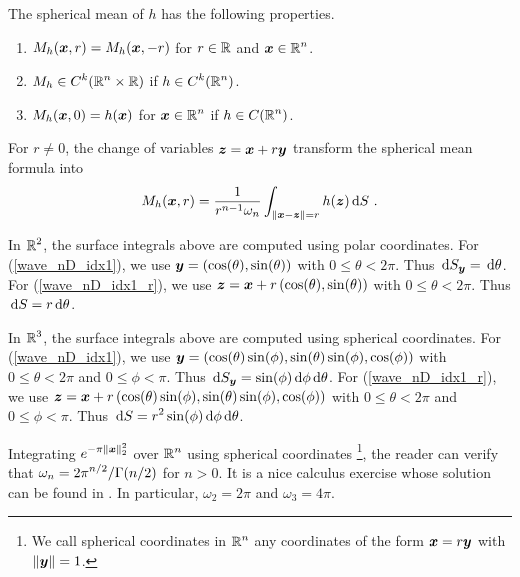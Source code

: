 The spherical mean of $h$ has the following properties.
\begin{enumerate}
\item $M_h({\bm{x}},r) = M_h({\bm{x}},-r)$ for $r\in \mathbb{R}$ and
$\displaystyle {\bm{x}} \in \mathbb{R}^n$.
\item $\displaystyle M_h \in C^k(\mathbb{R}^n\times \mathbb{R})$ if
$\displaystyle h \in C^k(\mathbb{R}^n)$.
\item $M_h({\bm{x}},0) = h({\bm{x}})$ for $\displaystyle {\bm{x}} \in \mathbb{R}^n$ if
$\displaystyle h \in C(\mathbb{R}^n)$.
\end{enumerate}

For $r\neq 0$, the change of variables ${\bm{z}} = {\bm{x}} + r {\bm{y}}$
transform the spherical mean formula into
\begin{equation} \label{wave_nD_idx1_r}
M_h({\bm{x}},r) = \frac{1}{r^{n-1} \omega_n}
\int_{\|{\bm{x}}-{\bm{z}}\|=r} h({\bm{z}}) \,\mathrm{d}{S} \ .
\end{equation}

In $\displaystyle \mathbb{R}^2$, the surface integrals above are computed using polar
coordinates.  For (\ref{wave_nD_idx1}), we use
$\displaystyle {\bm{y}} = \left( \cos(\theta), \sin(\theta) \right)$
with $0\leq \theta < 2\pi$.  Thus
$\displaystyle \,\mathrm{d}{S}_{{\bm{y}}} = \,\mathrm{d}{\theta}$.  For
(\ref{wave_nD_idx1_r}), we use 
$\displaystyle {\bm{z}} = {\bm{x}} + r\left(\cos(\theta),\sin(\theta) \right)$
with $0\leq \theta < 2\pi$.  Thus
$\displaystyle \,\mathrm{d}{S} = r \,\mathrm{d}{\theta}$.

In $\displaystyle \mathbb{R}^3$, the surface integrals above are computed using
spherical coordinates.  For (\ref{wave_nD_idx1}), we use
$\displaystyle {\bm{y}} = \left( \cos(\theta)\sin(\phi) ,
\sin(\theta)\sin(\phi) , \cos(\phi) \right)$
with $0\leq \theta < 2\pi$ and $0\leq \phi < \pi$.  Thus
$\displaystyle \,\mathrm{d}{S}_{{\bm{y}}} = \sin(\phi) \,\mathrm{d}{\phi}\,\mathrm{d}{\theta}$.  For
(\ref{wave_nD_idx1_r}), we use
$\displaystyle {\bm{z}} = {\bm{x}} + r\left(\cos(\theta)\sin(\phi) ,
\sin(\theta)\sin(\phi) , \cos(\phi) \right)$
with $0\leq \theta < 2\pi$ and $0\leq \phi < \pi$.  Thus
$\displaystyle \,\mathrm{d}{S} = r^2 \sin(\phi) \,\mathrm{d}{\phi}\,\mathrm{d}{\theta}$.

Integrating $\displaystyle e^{-\pi \|{\bm{x}}\|_2^2}$ over
$\displaystyle \mathbb{R}^n$ using spherical coordinates \footnote{We call
spherical coordinates in $\displaystyle \mathbb{R}^n$ any coordinates of the
form ${\bm{x}} = r {\bm{y}}$ with $\|{\bm{y}}\|=1$.}, the reader can verify that
$\displaystyle \omega_n = 2 \pi^{n/2}/\Gamma(n/2)$ for
$n>0$.  It is a nice calculus exercise whose solution can be found in
\cite{FoPDE}.  In particular, $\omega_2 = 2\pi$ and $\omega_3 = 4\pi$. 

